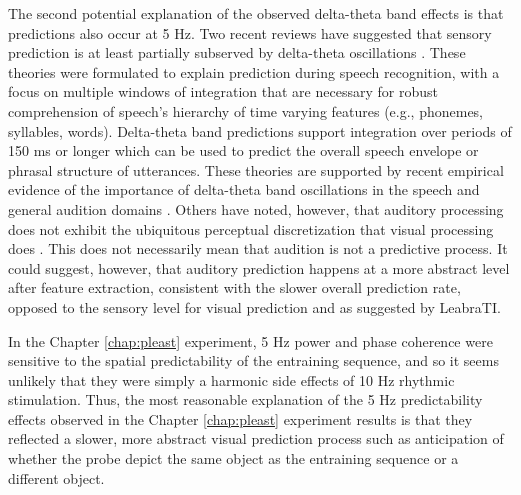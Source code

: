 \documentclass[dwyatte_dissertation.tex]{subfiles}
\begin{document}
The second potential explanation of the observed delta-theta band effects is that predictions also occur at 5 Hz. Two recent reviews have suggested that sensory prediction is at least partially subserved by delta-theta oscillations \cite{ArnalGiraud12,GiraudPoeppel12}. These theories were formulated to explain prediction during speech recognition, with a focus on multiple windows of integration that are necessary for robust comprehension of speech's hierarchy of time varying features (e.g., phonemes, syllables, words). Delta-theta band predictions support integration over periods of 150 ms or longer which can be used to predict the overall speech envelope \cite{AikenPicton08} or phrasal structure of utterances. These theories are supported by recent empirical evidence of the importance of delta-theta band oscillations in the speech \cite{ArnalWyartGiraud11} and general audition domains . Others have noted, however, that auditory processing does not exhibit the ubiquitous perceptual discretization that visual processing does \cite{VanRullenZoefelIlhan14}. This does not necessarily mean that audition is not a predictive process. It could suggest, however, that auditory prediction happens at a more abstract level after feature extraction, consistent with the slower overall prediction rate, opposed to the sensory level for visual prediction and as suggested by LeabraTI. 

In the Chapter \ref{chap:pleast} experiment, 5 Hz power and phase coherence were sensitive to the spatial predictability of the entraining sequence, and so it seems unlikely that they were simply a harmonic side effects of 10 Hz rhythmic stimulation. Thus, the most reasonable explanation of the 5 Hz predictability effects observed in the Chapter \ref{chap:pleast} experiment results is that they reflected a slower, more abstract visual prediction process such as anticipation of whether the probe depict the same object as the entraining sequence or a different object. 
\end{document}
